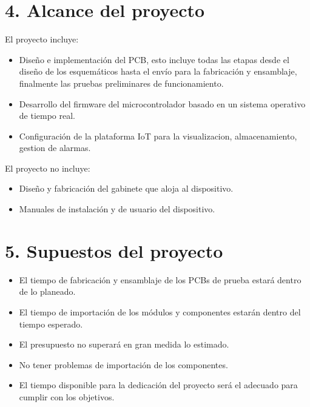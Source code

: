 \documentclass[
11pt, %
codirector, %
]{charter}
\begin{document}
\section{4. Alcance del proyecto}
\label{sec:alcance}
El proyecto incluye:
\begin{itemize}
	\item Diseño e implementación del PCB, esto incluye todas las etapas desde el diseño de los esquemáticos hasta el envío para la fabricación y ensamblaje, finalmente las pruebas preliminares de funcionamiento.
	\item Desarrollo del firmware del microcontrolador basado en un sistema operativo de tiempo real.
	\item Configuración de la plataforma IoT para la visualizacion, almacenamiento, gestion de alarmas.
\end{itemize}
El proyecto no incluye:
\begin{itemize}
	\item Diseño y fabricación del gabinete que aloja al dispositivo.
	\item Manuales de instalación y de usuario del dispositivo.
\end{itemize}

\section{5. Supuestos del proyecto}
\label{sec:supuestos}

\begin{itemize}
	\item El tiempo de fabricación y ensamblaje de los PCBs de prueba estará dentro de lo planeado.
	\item El tiempo de importación de los módulos y componentes estarán dentro del tiempo esperado.
	\item El presupuesto no superará en gran medida lo estimado.
	\item No tener problemas de importación de los componentes.
	\item El tiempo disponible para la dedicación del proyecto será el adecuado para cumplir con
	los objetivos.
 
\end{itemize}
\end{document}
